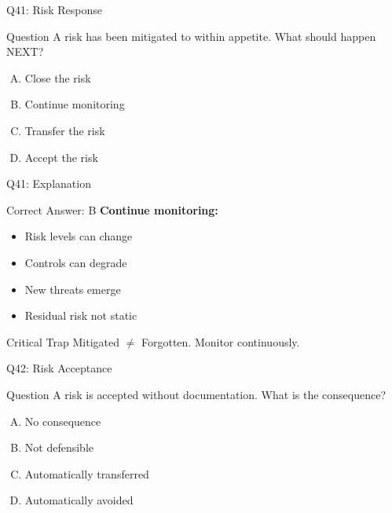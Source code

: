 \documentclass{beamer}
\begin{document}
			\begin{frame}{Q41: Risk Response}
				\begin{block}{Question}
					A risk has been mitigated to within appetite. What should happen NEXT?
				\end{block}
				\begin{enumerate}[(A)]
					\item Close the risk
					\item Continue monitoring
					\item Transfer the risk
					\item Accept the risk
				\end{enumerate}
			\end{frame}
			
			\begin{frame}{Q41: Explanation}
				\begin{block}{Correct Answer: B}
					\textbf{Continue monitoring:}
					\begin{itemize}
						\item Risk levels can change
						\item Controls can degrade
						\item New threats emerge
						\item Residual risk not static
					\end{itemize}
				\end{block}
				\begin{alertblock}{Critical Trap}
					Mitigated $\neq$ Forgotten. Monitor continuously.
				\end{alertblock}
			\end{frame}
			
			\begin{frame}{Q42: Risk Acceptance}
				\begin{block}{Question}
					A risk is accepted without documentation. What is the consequence?
				\end{block}
				\begin{enumerate}[(A)]
					\item No consequence
					\item Not defensible
					\item Automatically transferred
					\item Automatically avoided
				\end{enumerate}
			\end{frame}
			
\end{document}
